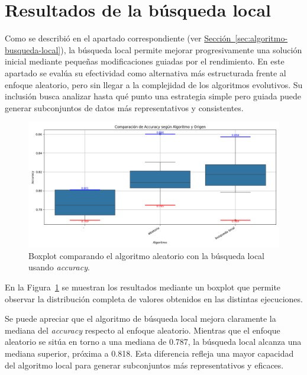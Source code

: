 \section{Resultados de la búsqueda local}\label{sec:resultados-busqueda-local}
Como se describió en el apartado correspondiente (ver \hyperref[sec:algoritmo-busqueda-local]{Sección~\ref*{sec:algoritmo-busqueda-local}}),
la búsqueda local permite mejorar progresivamente una solución inicial mediante pequeñas modificaciones guiadas por el rendimiento.
En este apartado se evalúa su efectividad como alternativa más estructurada frente al enfoque aleatorio, pero sin llegar a la complejidad de los algoritmos evolutivos.
Su inclusión busca analizar hasta qué punto una estrategia simple pero guiada puede generar subconjuntos de datos más representativos y consistentes.

\begin{figure}[htp]
    \centering
    \includegraphics[width=1\textwidth]{imagenes/evaluaciones/comparacion_aleatorio-bl}
    \caption{Boxplot comparando el algoritmo aleatorio con la búsqueda local usando \textit{accuracy}.}
    \label{fig:aleatorio-vs-busqueda-local}
\end{figure}

En la Figura~\ref{fig:aleatorio-vs-busqueda-local} se muestran los resultados mediante un boxplot que permite observar
la distribución completa de valores obtenidos en las distintas ejecuciones.

Se puede apreciar que el algoritmo de búsqueda local mejora claramente la mediana del \textit{accuracy} respecto al enfoque aleatorio.
Mientras que el enfoque aleatorio se sitúa en torno a una mediana de 0.787, la búsqueda local alcanza una mediana superior, próxima a 0.818.
Esta diferencia refleja una mayor capacidad del algoritmo local para generar subconjuntos más representativos y eficaces.


